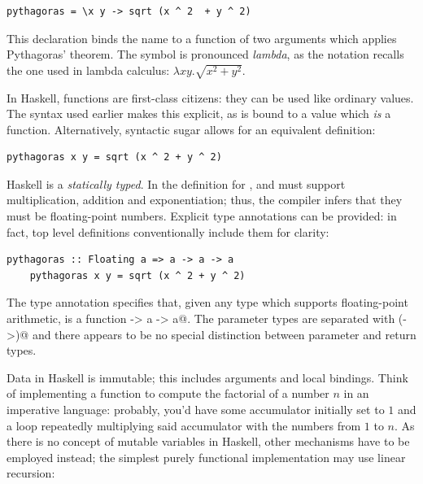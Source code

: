 \documentclass[UdineBachThesis,american,11pt]{PhdThesis}
\begin{document}
  \begin{lstlisting}[gobble=4,basicstyle=\ttfamily\small]
    pythagoras = \x y -> sqrt (x ^ 2  + y ^ 2)
  \end{lstlisting}

  \pagebreak

  This declaration binds the name \lstinline@pythagoras@ to a function of two
  arguments which applies Pythagoras' theorem. The symbol \lstinline@\@ is
  pronounced \emph{lambda}, as the notation recalls the one used in lambda
  calculus: $\lambda x y . \sqrt{x^2 + y^2}$.

  In Haskell, functions are first-class citizens: they can be used like ordinary
  values. The syntax used earlier makes this explicit, as \lstinline@pythagoras@
  is bound to a value which \emph{is} a function. Alternatively, syntactic sugar
  allows for an equivalent definition:

  \begin{lstlisting}[gobble=4,basicstyle=\ttfamily\small]
    pythagoras x y = sqrt (x ^ 2 + y ^ 2)
  \end{lstlisting}

  Haskell is a \emph{statically typed}. In the definition for
  \lstinline@pythagoras@, \lstinline@x@ and \lstinline@y@ must support
  multiplication, addition and exponentiation; thus, the compiler infers that
  they must be floating-point numbers. Explicit type annotations can be
  provided: in fact, top level definitions conventionally include them for
  clarity:

  \begin{lstlisting}[gobble=4,basicstyle=\ttfamily\small]
    pythagoras :: Floating a => a -> a -> a
    pythagoras x y = sqrt (x ^ 2 + y ^ 2)
  \end{lstlisting}

  The type annotation specifies that, given any type \lstinline@a@ which
  supports floating-point arithmetic, \lstinline@pythagoras@ is a function
  \lstinline@a -> a -> a@. The parameter types are separated with
  \lstinline@(->)@ and there appears to be no special distinction between
  parameter and return types.

  Data in Haskell is immutable; this includes arguments and local bindings.
  Think of implementing a function to compute the factorial of a number $n$ in
  an imperative language: probably, you'd have some accumulator initially set to
  $1$ and a loop repeatedly multiplying said accumulator with the numbers from
  $1$ to $n$. As there is no concept of mutable variables in Haskell, other
  mechanisms have to be employed instead; the simplest purely functional
  implementation may use linear recursion:
\end{document}
